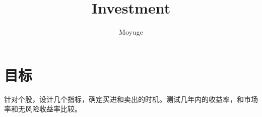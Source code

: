 \documentclass[]{report}
\title{Investment}
\author{Moyuge}
\begin{document}
\maketitle

\begin{abstract}
\end{abstract}

\section{目标}
针对个股，设计几个指标，确定买进和卖出的时机。测试几年内的收益率，和市场率和无风险收益率比较。
\end{document}
